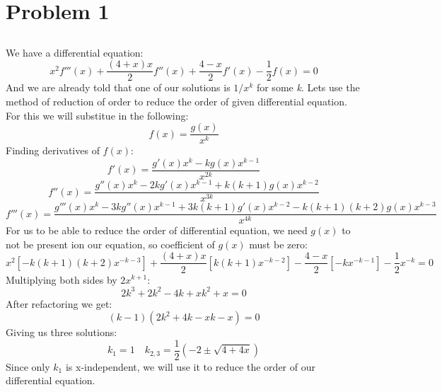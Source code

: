 \documentclass[12pt]{article}
\begin{document}
\renewcommand{\familydefault}{\rmdefault}




\section{Problem 1}
\subsection{}
We have a differential equation:
\begin{equation}
    x^2f'''(x)+\frac{(4+x)x}{2}f''(x)+\frac{4-x}{2}f'(x) - \frac{1}{2}f(x) = 0
\end{equation}
And we are already told that one of our solutions is $1/x^k$ for some \textit{k}. Lets use the method of reduction of order to reduce the order of given differential equation.
For this we will substitue in the following:
\begin{equation}
    f(x) = \frac{g(x)}{x^k}
\end{equation}
Finding derivatives of $f(x)$:
\begin{equation}
    f'(x) = \frac{g'(x)x^k - kg(x)x^{k-1}}{x^{2k}}
\end{equation}
\begin{equation}
    f''(x) = \frac{g''(x)x^k - 2kg'(x)x^{k-1} + k(k+1)g(x)x^{k-2}}{x^{3k}}
\end{equation}
\begin{equation}
    f'''(x) = \frac{g'''(x)x^k - 3kg''(x)x^{k-1} + 3k(k+1)g'(x)x^{k-2} - k(k+1)(k+2)g(x)x^{k-3}}{x^{4k}}
\end{equation}
For us to be able to reduce the order of differential equation, we need $g(x)$ to not be present ion our equation, so coefficient of $g(x)$ must be zero:
\begin{equation}
    x^2\left[-k(k+1)(k+2)x^{-k-3}\right]+ \frac{(4+x)x}{2} \left[k(k+1)x^{-k-2}\right]-\frac{4-x}{2}\left[-kx^{-k-1}\right]-\frac{1}{2}x^{-k}=0
\end{equation}
Multiplying both sides by $2x^{k+1}$:
\begin{equation}
    2k^3+2k^2-4k+xk^2+x = 0
\end{equation}
After refactoring we get:
\begin{equation}
    \left(k-1\right)\left(2k^2+4k-xk-x\right) = 0
\end{equation}
Giving us three solutions:
\begin{equation}
    k_1 = 1 \quad k_{2,3} = \frac{1}{2}\left(-2\pm\sqrt{4+4x}\right)
\end{equation}
Since only $k_1$ is x-independent, we will use it to reduce the order of our differential equation.
\end{document}

